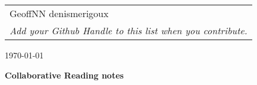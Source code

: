 \documentclass[12pt]{article}
\begin{document}
{\parindent 0pt
\begin{tabular}[t]{l}
GeoffNN
denismerigoux
\\ \textit{Add your Github Handle to this list when you contribute.}
\end{tabular}  \hfill \today \vskip 0.2in }

\parindent 0pt
\parskip 8pt

\begin{center}
\large\bf Collaborative Reading notes
\end{center}

\bigskip





\end{document}
